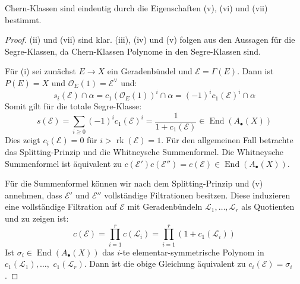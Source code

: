 \documentclass[10pt,a4paper]{article}
\begin{document}
\begin{remark}
Chern-Klassen sind eindeutig durch die Eigenschaften (v), (vi) und (vii) bestimmt.
\end{remark}

\begin{proof}
(ii) und (vii) sind klar. (iii), (iv) und (v) folgen aus den Aussagen für die Segre-Klassen, da Chern-Klassen Polynome in den Segre-Klassen sind.

Für (i) sei zunächst $E\to X$ ein Geradenbündel und $\mathcal{E} = \Gamma(E)$. Dann ist $P(E)=X$ und $\mathcal{O}_E(1)=\mathcal{E}^\vee$ und:
\[ s_i(\mathcal{E})\cap\alpha = c_1(\mathcal{O}_E(1))^i\cap\alpha = (-1)^ic_1(\mathcal{E})^i\cap\alpha \]
Somit gilt für die totale Segre-Klasse:
\[ s(\mathcal{E}) = \sum_{i\geq 0}(-1)^ic_1(\mathcal{E})^i = \frac{1}{1+c_1(\mathcal{E})}\in\operatorname{End}(A_\bullet(X)) \]
Dies zeigt $c_i(\mathcal{E}) = 0$ für $i> \operatorname{rk}(\mathcal{E}) = 1$. Für den allgemeinen Fall betrachte das Splitting-Prinzip und die Whitneysche Summenformel. Die Whitneysche Summenformel ist äquivalent zu $c(\mathcal{E}')c(\mathcal{E}'') = c(\mathcal{E})\in\operatorname{End}(A_\bullet(X))$. 

Für die Summenformel können wir nach dem Splitting-Prinzip und (v) annehmen, dass $\mathcal{E}'$ und $\mathcal{E}''$ vollständige Filtrationen besitzen. Diese induzieren eine vollständige Filtration auf $\mathcal{E}$ mit Geradenbündeln $\mathcal{L}_1,\ldots,\mathcal{L}_r$ als Quotienten und zu zeigen ist:
\[ c(\mathcal{E}) = \prod_{i=1}^r c(\mathcal{L}_i) = \prod_{i=1}^r(1+c_1(\mathcal{L}_i)) \]
Ist $\sigma_i\in\operatorname{End}(A_\bullet(X))$ das $i$-te elementar-symmetrische Polynom in $c_1(\mathcal{L}_1),\ldots,$ $c_1(\mathcal{L}_r)$. Dann ist die obige Gleichung äquivalent zu $c_i(\mathcal{E}) = \sigma_i$. 


\end{proof}
\end{document}
